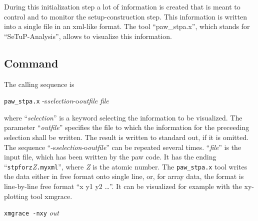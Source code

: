 \documentclass[final,12pt]{article}
\begin{document}
{{{During this initialization step a lot of information is created that
is meant to control and to monitor the setup-construction step. This
information is written into a single file in an xml-like format. The
tool ``paw\_stpa.x'', which stands for ``SeTuP-Analysis'', allows to
visualize this information.

\subsection{Command}

The calling sequence is
\begin{center}
\verb|paw_stpa.x| 
 \quad-s\quad\textit{selection}\quad\textrm{-o}\quad\textit{outfile} \quad\textit{file}
\end{center}
where ``\textit{selection}'' is a keyword selecting the information to
be visualized.  The parameter ``\textit{outfile}'' specifies the file
to which the information for the preceeding selection shall be
written. The result is written to standard out, if it is omitted.  The
sequence
``-s\quad\textit{selection}\quad\textrm{-o}\quad\textit{outfile}'' can
be repeated several times.  ``\textit{file}'' is the input file, which
has been written by the paw code. It has the ending
``\verb|stpforz|\textit{Z}\verb|.myxml|'', where \textit{Z} is the
atomic number. The \verb|paw_stpa.x| tool writes the data either in
free format onto single line, or, for array data, the format is
line-by-line free format ``x y1 y2 \ldots''.  It can be visualized for
example with the xy-plotting tool xmgrace.
\begin{center}
\verb|xmgrace -nxy| \textit{out}
\end{center}

}}}
\end{document}

